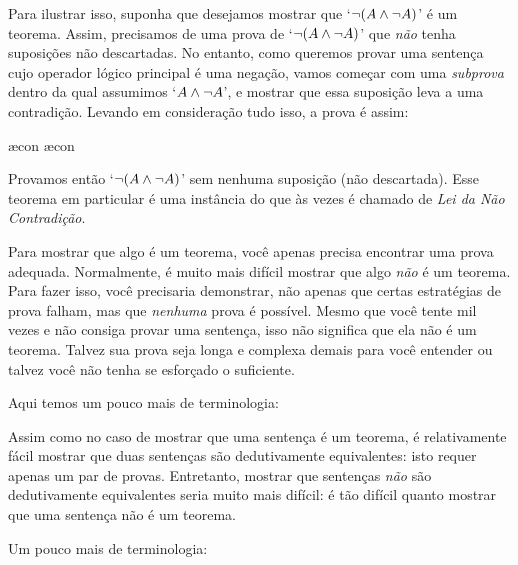 Para ilustrar isso, suponha que desejamos mostrar que `$\neg (A \wedge \neg A)$' é um teorema. Assim, precisamos de uma prova de `$\neg(A \wedge \neg A)$' que \emph{não} tenha suposições não descartadas. No entanto, como queremos provar uma sentença cujo operador lógico principal é uma negação, vamos começar com uma \emph{subprova}  dentro da qual assumimos `$A \wedge \neg A$', e mostrar que essa suposição leva a uma contradição. Levando em consideração tudo isso, a prova é assim:
	\begin{fitchproof}
		\open
			\ae{con}
			\ae{con}
		\close
	\end{fitchproof}
Provamos então `$\neg (A \wedge \neg A)$' sem nenhuma suposição (não descartada).  Esse teorema em particular é uma instância do que às vezes é chamado de \emph{Lei da Não Contradição}.

Para mostrar que algo é um teorema, você apenas precisa encontrar uma prova adequada. Normalmente, é muito mais difícil mostrar que algo \emph{não} é um teorema. Para fazer isso, você precisaria demonstrar, não apenas que certas estratégias de prova falham, mas que \emph{nenhuma} prova é possível. Mesmo que você tente mil vezes e não consiga provar uma sentença, isso não significa que ela não é um teorema. Talvez sua prova seja longa e complexa demais para você entender ou talvez você não tenha se esforçado o suficiente.

Aqui temos um pouco mais de terminologia:

Assim como no caso de mostrar que uma sentença é um teorema, é relativamente fácil mostrar que duas sentenças são dedutivamente equivalentes: isto requer apenas um par de provas. Entretanto, mostrar que sentenças \emph{não} são dedutivamente equivalentes seria muito mais difícil: é tão difícil quanto mostrar que uma sentença não é um teorema.

Um pouco mais de terminologia:
        
